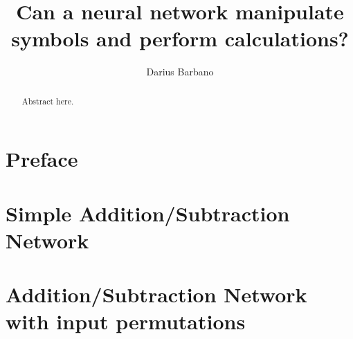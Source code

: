 \documentclass[12pt]{article}
\begin{document}
\title{Can a neural network manipulate symbols and perform calculations? }
\author{Darius Barbano}
\date{}
\maketitle
\begin{abstract}
   Abstract here.
\end{abstract}
\newpage
\section{Preface}


\newpage
\section{Simple Addition/Subtraction Network}


\section{Addition/Subtraction Network with input permutations}

\end{document}
